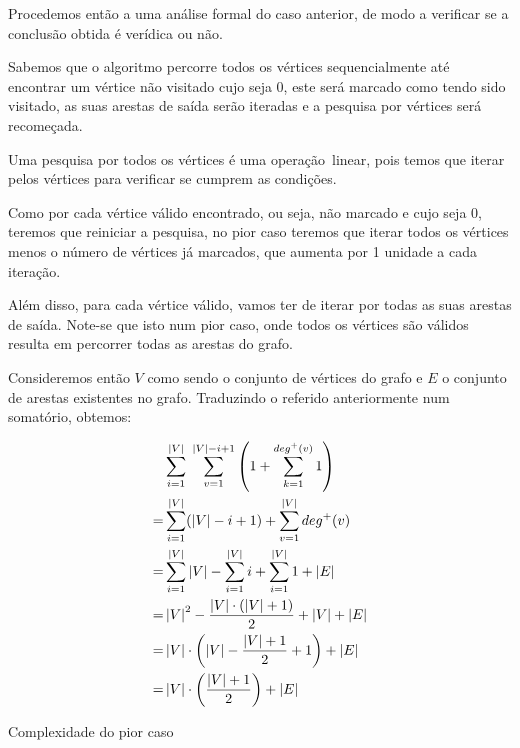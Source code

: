 Procedemos então a uma análise formal do caso anterior, de modo a
verificar se a conclusão obtida é verídica ou não.

Sabemos que o algoritmo percorre todos os vértices sequencialmente até encontrar
um vértice não visitado cujo  seja 0, este será marcado como
tendo sido visitado, as suas arestas de saída serão iteradas e a pesquisa por
vértices será recomeçada.

Uma pesquisa por todos os vértices é uma operação linear, pois temos que iterar
pelos vértices para verificar se cumprem as condições.

Como por cada vértice válido encontrado, ou seja, não marcado e cujo
 seja 0, teremos que reiniciar a pesquisa, no pior caso
teremos que iterar todos os vértices menos o número de vértices já marcados,
que aumenta por 1 unidade a cada iteração.

Além disso, para cada vértice válido, vamos ter de iterar por todas as suas
arestas de saída. Note-se que isto num pior caso, onde todos os vértices são
válidos resulta em percorrer todas as arestas do grafo.

Consideremos então $V$ como sendo o conjunto de vértices do grafo e $E$ o
conjunto de arestas existentes no grafo. Traduzindo o referido anteriormente num
somatório, obtemos:

\begin{listing}[H]
	\begin{align}
		  & \sum_{i = 1}^{\norm{V}} \; \sum_{v=1}^{\norm{V} - i + 1}
		\left( 1 + \sum_{k=1}^{deg^+(v)} 1 \right)                          \\
		= & \sum_{i = 1}^{\norm{V}} (\norm{V} - i + 1)
		+ \sum_{v=1}^{\norm{V}} deg^+(v)                                    \\
		= & \sum_{i=1}^{\norm{V}} \norm{V} - \sum_{i=1}^{\norm{V}} i
		+ \sum_{i=1}^{\norm{V}} 1 + \norm{E}                                \\
		= & \norm{V}^2 - \frac{\norm{V} \cdot (\norm{V} + 1)}{2} + \norm{V}
		+ \norm{E}                                                          \\
		= & \norm{V} \cdot \left(
		\norm{V} - \frac{\norm{V} + 1}{2} + 1
		\right) + \norm{E}                                                  \\
		= & \norm{V} \cdot \left( \frac{\norm{V} + 1}{2} \right) + \norm{E}
	\end{align}
	\caption{Complexidade do pior caso}
\end{listing}

